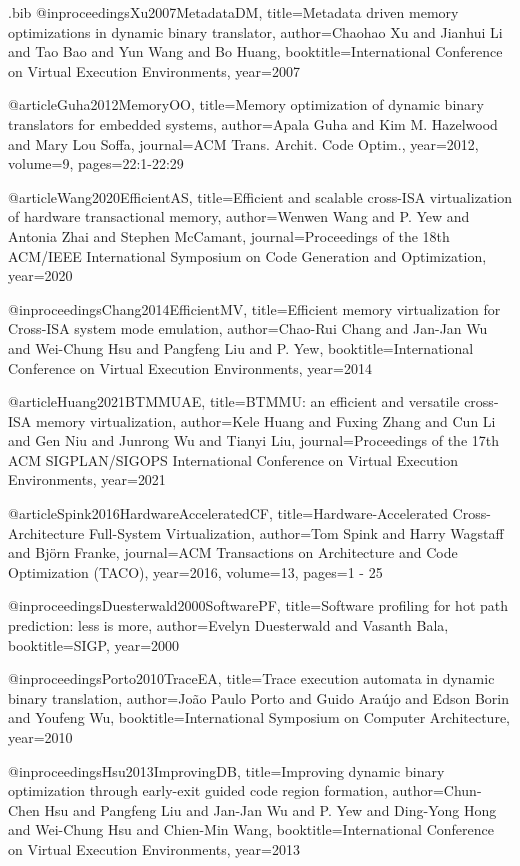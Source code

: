 \begin{filecontents}{\jobname.bib}
@inproceedings{Xu2007MetadataDM,
  title={Metadata driven memory optimizations in dynamic binary translator},
  author={Chaohao Xu and Jianhui Li and Tao Bao and Yun Wang and Bo Huang},
  booktitle={International Conference on Virtual Execution Environments},
  year={2007}
}

@article{Guha2012MemoryOO,
  title={Memory optimization of dynamic binary translators for embedded systems},
  author={Apala Guha and Kim M. Hazelwood and Mary Lou Soffa},
  journal={ACM Trans. Archit. Code Optim.},
  year={2012},
  volume={9},
  pages={22:1-22:29}
}

@article{Wang2020EfficientAS,
  title={Efficient and scalable cross-ISA virtualization of hardware transactional memory},
  author={Wenwen Wang and P. Yew and Antonia Zhai and Stephen McCamant},
  journal={Proceedings of the 18th ACM/IEEE International Symposium on Code Generation and Optimization},
  year={2020}
}

@inproceedings{Chang2014EfficientMV,
  title={Efficient memory virtualization for Cross-ISA system mode emulation},
  author={Chao-Rui Chang and Jan-Jan Wu and Wei-Chung Hsu and Pangfeng Liu and P. Yew},
  booktitle={International Conference on Virtual Execution Environments},
  year={2014}
}

@article{Huang2021BTMMUAE,
  title={BTMMU: an efficient and versatile cross-ISA memory virtualization},
  author={Kele Huang and Fuxing Zhang and Cun Li and Gen Niu and Junrong Wu and Tianyi Liu},
  journal={Proceedings of the 17th ACM SIGPLAN/SIGOPS International Conference on Virtual Execution Environments},
  year={2021}
}

@article{Spink2016HardwareAcceleratedCF,
  title={Hardware-Accelerated Cross-Architecture Full-System Virtualization},
  author={Tom Spink and Harry Wagstaff and Bj{\"o}rn Franke},
  journal={ACM Transactions on Architecture and Code Optimization (TACO)},
  year={2016},
  volume={13},
  pages={1 - 25}
}

@inproceedings{Duesterwald2000SoftwarePF,
  title={Software profiling for hot path prediction: less is more},
  author={Evelyn Duesterwald and Vasanth Bala},
  booktitle={SIGP},
  year={2000}
}

@inproceedings{Porto2010TraceEA,
  title={Trace execution automata in dynamic binary translation},
  author={Jo{\~a}o Paulo Porto and Guido Ara{\'u}jo and Edson Borin and Youfeng Wu},
  booktitle={International Symposium on Computer Architecture},
  year={2010}
}

@inproceedings{Hsu2013ImprovingDB,
  title={Improving dynamic binary optimization through early-exit guided code region formation},
  author={Chun-Chen Hsu and Pangfeng Liu and Jan-Jan Wu and P. Yew and Ding-Yong Hong and Wei-Chung Hsu and Chien-Min Wang},
  booktitle={International Conference on Virtual Execution Environments},
  year={2013}
}


\end{filecontents}
